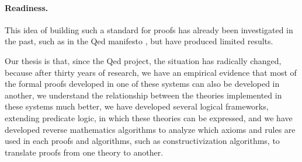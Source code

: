 \paragraph{Readiness.}
This idea of building such a standard for proofs has already been
investigated in the past, such as in the Qed manifesto \cite{Qed94}, but
have produced limited results.

Our thesis is that, since the
Qed project, the situation has radically changed, because after
thirty years of research, we have an empirical evidence that most of
the formal proofs developed in one of these systems can also be
developed in another, we understand the relationship between the
theories implemented in these systems much better, we have developed
several logical frameworks, extending predicate logic, in which these
theories can be expressed, and we have developed reverse mathematics
algorithms to analyze which axioms and rules are used in each proofs
and algorithms, such as constructivization algorithms, to translate
proofs from one theory to another.


